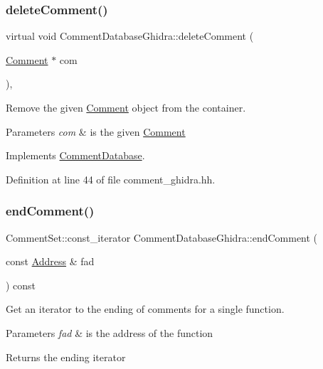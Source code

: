 \subsubsection{\texorpdfstring{deleteComment()}{deleteComment()}}
{\footnotesize\ttfamily virtual void Comment\+Database\+Ghidra\+::delete\+Comment (\begin{DoxyParamCaption}\item[{\mbox{\hyperlink{class_comment}{Comment}} $\ast$}]{com }\end{DoxyParamCaption})\hspace{0.3cm}{\ttfamily [inline]}, {\ttfamily [virtual]}}



Remove the given \mbox{\hyperlink{class_comment}{Comment}} object from the container. 


\begin{DoxyParams}{Parameters}
{\em com} & is the given \mbox{\hyperlink{class_comment}{Comment}} \\
\hline
\end{DoxyParams}


Implements \mbox{\hyperlink{class_comment_database_ac41202723e47b57dd4996d484629d019}{Comment\+Database}}.



Definition at line 44 of file comment\+\_\+ghidra.\+hh.

\mbox{\label{class_comment_database_ghidra_aab66e37f898fbd4f15dedfe11d024b9c}} 
\subsubsection{\texorpdfstring{endComment()}{endComment()}}
{\footnotesize\ttfamily Comment\+Set\+::const\+\_\+iterator Comment\+Database\+Ghidra\+::end\+Comment (\begin{DoxyParamCaption}\item[{const \mbox{\hyperlink{class_address}{Address}} \&}]{fad }\end{DoxyParamCaption}) const\hspace{0.3cm}{\ttfamily [virtual]}}



Get an iterator to the ending of comments for a single function. 


\begin{DoxyParams}{Parameters}
{\em fad} & is the address of the function \\
\hline
\end{DoxyParams}
\begin{DoxyReturn}{Returns}
the ending iterator 
\end{DoxyReturn}


